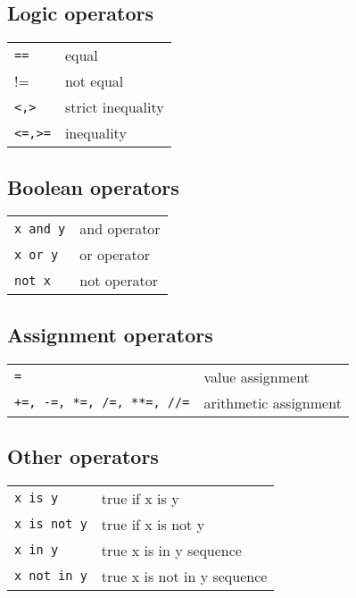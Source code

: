     \subsection{Logic operators}
        \begin{tabular}{@{}ll@{}}
            \verb!==!    & equal \\
            !=    & not equal \\
            \verb!<,>!     & strict inequality \\
            \verb!<=,>=!      & inequality \\
        \end{tabular}


    \subsection{Boolean operators}
        \begin{tabular}{@{}ll@{}}
            \verb!x and y!    & and operator \\
            \verb!x or y!    & or operator \\
            \verb!not x!    & not operator \\
        \end{tabular}
        
        
    \subsection{Assignment operators}
        \begin{tabular}{@{}ll@{}}
            \verb!=!    & value assignment \\
            \verb!+=, -=, *=, /=, **=, //=!    & arithmetic assignment \\
        \end{tabular}
        
        
    \subsection{Other operators}
        \begin{tabular}{@{}ll@{}}
            \verb!x is y!    & true if x is y \\
            \verb!x is not y!    & true if x is not y \\
            \verb!x in y!    & true x is in y sequence \\
            \verb!x not in y!    & true x is not in y sequence \\
        \end{tabular}
        
